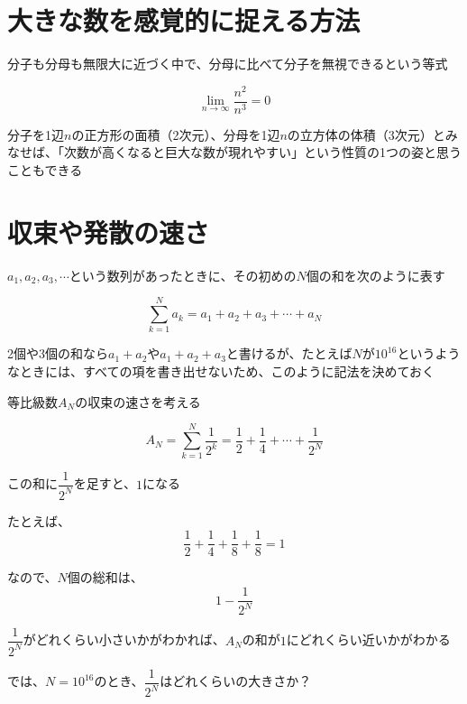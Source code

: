 \documentclass[../book_jiriki_calc]{subfiles}
\begin{document}
\section{大きな数を感覚的に捉える方法}

分子も分母も無限大に近づく中で、分母に比べて分子を無視できるという等式

\begin{equation}
  \lim_{n\to \infty }\frac{n^2}{n^3}=0
\end{equation}

分子を1辺$n$の正方形の面積（2次元）、分母を1辺$n$の立方体の体積（3次元）とみなせば、「次数が高くなると巨大な数が現れやすい」という性質の1つの姿と思うこともできる

\section{収束や発散の速さ}

$a_1, a_2, a_3, \cdots$という数列があったときに、その初めの$N$個の和を次のように表す

\begin{equation}
  \sum_{k=1}^{N}a_k = a_1 + a_2 + a_3 + \cdots + a_N
\end{equation}

2個や3個の和なら$a_1 + a_2$や$a_1 + a_2 + a_3$と書けるが、たとえば$N$が$10^{16}$というようなときには、すべての項を書き出せないため、このように記法を決めておく

\sectionline

等比級数$A_N$の収束の速さを考える

\begin{equation}
  A_N = \sum_{k=1}^{N}\dfrac{1}{2^k} = \dfrac{1}{2} + \dfrac{1}{4} + \cdots + \dfrac{1}{2^N}
\end{equation}

この和に$\dfrac{1}{2^N}$を足すと、$1$になる

たとえば、
\begin{equation}
  \dfrac{1}{2} + \dfrac{1}{4} + \dfrac{1}{8} + \dfrac{1}{8} = 1
\end{equation}

なので、$N$個の総和は、
\begin{equation}
  1 - \dfrac{1}{2^N}
\end{equation}

$\dfrac{1}{2^N}$がどれくらい小さいかがわかれば、$A_N$の和が$1$にどれくらい近いかがわかる

\br

では、$N=10^{16}$のとき、$\dfrac{1}{2^N}$はどれくらいの大きさか？
\end{document}
